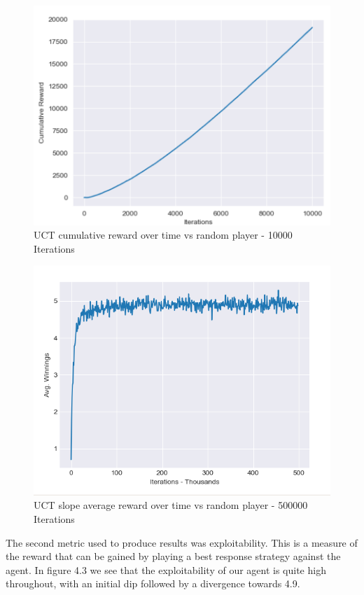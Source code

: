 \begin{figure}[ht]
    \includegraphics[scale=.8]{images/cumulative_reward_mcts_vs_random.png}
    \caption{UCT cumulative reward over time vs random player - 10000 Iterations}
\end{figure}

\begin{figure}[ht]
    \includegraphics[scale=.7]{images/avg_reward_500000__20_random.png}
    \caption{UCT slope average reward over time vs random player - 500000 Iterations}
\end{figure}

The second metric used to produce results was exploitability.
This is a measure of the reward that can be gained by playing a best response strategy
against the agent.
In figure 4.3 we see that the exploitability of our agent is quite high throughout, with an
initial dip followed by a divergence towards 4.9.

